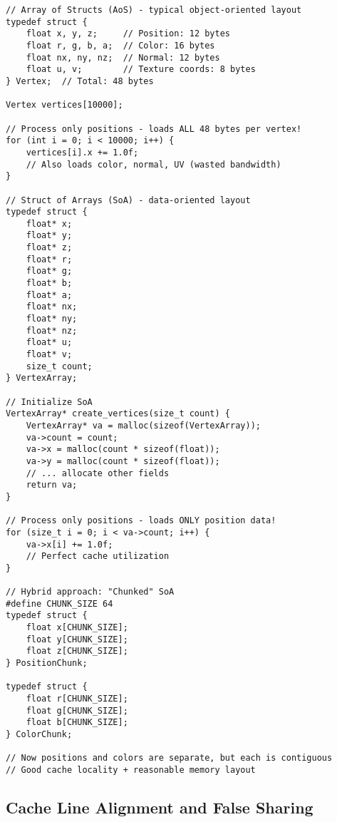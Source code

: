\begin{lstlisting}
// Array of Structs (AoS) - typical object-oriented layout
typedef struct {
    float x, y, z;     // Position: 12 bytes
    float r, g, b, a;  // Color: 16 bytes
    float nx, ny, nz;  // Normal: 12 bytes
    float u, v;        // Texture coords: 8 bytes
} Vertex;  // Total: 48 bytes

Vertex vertices[10000];

// Process only positions - loads ALL 48 bytes per vertex!
for (int i = 0; i < 10000; i++) {
    vertices[i].x += 1.0f;
    // Also loads color, normal, UV (wasted bandwidth)
}

// Struct of Arrays (SoA) - data-oriented layout
typedef struct {
    float* x;
    float* y;
    float* z;
    float* r;
    float* g;
    float* b;
    float* a;
    float* nx;
    float* ny;
    float* nz;
    float* u;
    float* v;
    size_t count;
} VertexArray;

// Initialize SoA
VertexArray* create_vertices(size_t count) {
    VertexArray* va = malloc(sizeof(VertexArray));
    va->count = count;
    va->x = malloc(count * sizeof(float));
    va->y = malloc(count * sizeof(float));
    // ... allocate other fields
    return va;
}

// Process only positions - loads ONLY position data!
for (size_t i = 0; i < va->count; i++) {
    va->x[i] += 1.0f;
    // Perfect cache utilization
}

// Hybrid approach: "Chunked" SoA
#define CHUNK_SIZE 64
typedef struct {
    float x[CHUNK_SIZE];
    float y[CHUNK_SIZE];
    float z[CHUNK_SIZE];
} PositionChunk;

typedef struct {
    float r[CHUNK_SIZE];
    float g[CHUNK_SIZE];
    float b[CHUNK_SIZE];
} ColorChunk;

// Now positions and colors are separate, but each is contiguous
// Good cache locality + reasonable memory layout
\end{lstlisting}

\subsection{Cache Line Alignment and False Sharing}

